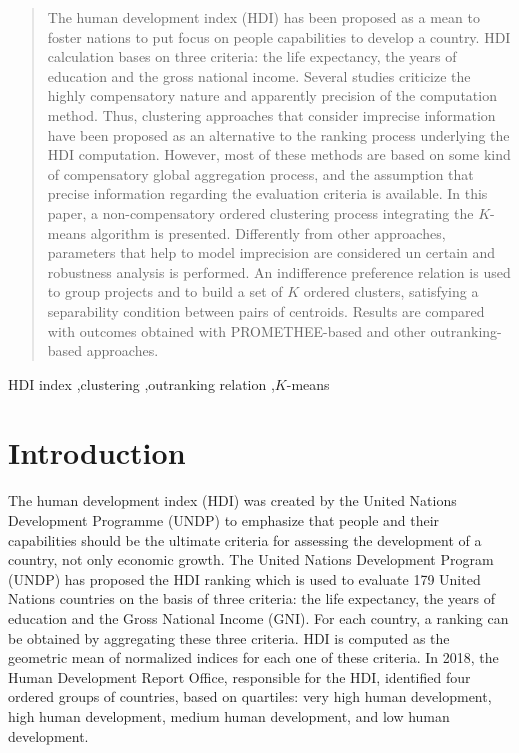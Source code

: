 \documentclass[]{elsarticle}
\theoremstyle{definition}
\begin{document}
\begin{frontmatter}
\begin{abstract}
The human development index (HDI) has been proposed as a mean to foster nations to put focus on people capabilities to develop a country.  HDI calculation bases on three criteria: the life expectancy, the years of education and the gross national income. Several studies criticize the highly compensatory nature and apparently precision of the computation method. Thus, clustering approaches that consider imprecise information  have been proposed as an alternative to the ranking process underlying the HDI computation. However, most of these methods are based on some kind of compensatory global aggregation process, and the assumption that precise information regarding the evaluation criteria is available.    In this paper, a non-compensatory ordered clustering process integrating  the $K$-means algorithm is presented. Differently from other approaches, parameters that help to model imprecision are considered un certain and robustness analysis is performed.  An indifference preference relation is used to group projects and to build a set of $K$ ordered clusters, satisfying a separability condition between pairs of centroids. Results are compared with outcomes obtained with PROMETHEE-based and other outranking-based approaches.
\end{abstract}

\begin{keyword}
HDI index \sep clustering \sep outranking relation \sep $K$-means
\end{keyword}

\end{frontmatter}


\section{Introduction}

The human development index (HDI) was created by the United Nations Development Programme (UNDP) to emphasize that people and their capabilities should be the ultimate criteria for assessing the development of a country, not only economic growth. The United Nations Development Program (UNDP) has proposed the HDI ranking which is used to evaluate  179 United Nations countries on the basis of three criteria: the life expectancy, the years of education and the Gross National Income (GNI). For each country, a ranking can be obtained by aggregating these three criteria.  HDI is computed as the geometric mean of normalized indices for each one of these criteria.  In 2018, the Human Development Report Office, responsible for the HDI, identified four ordered groups of countries, based on quartiles: very high human development, high human development, medium human development, and low human development.   
\end{document}
